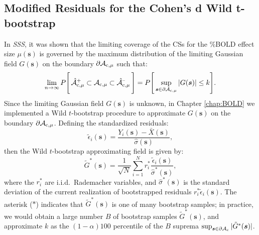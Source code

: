 \subsection{Modified Residuals for the Cohen's d Wild t-bootstrap}
\label{sec:Wild_t_bootstrap}
In \textit{SSS}, it was shown that the limiting coverage of the CSs for the \%BOLD effect size $\mu(\bm{s})$ is governed by the maximum distribution of the limiting Gaussian field $G(\bm{s})$ on the boundary $\operatorname{\partial\mathcal{A}_{c,\mu}}$ such that:
\begin{equation}
\label{Result_1}
\lim_{n\rightarrow\infty} P  \Bigg[\operatorname{\hat{\mathcal{A}}_{c,\mu}^+} \subset \operatorname{\mathcal{A}_{c,\mu}} \subset \operatorname{\hat{\mathcal{A}}_{c,\mu}^{\textrm{--}}} \Bigg] = P \Bigg[\sup_{\bm{s}\in\operatorname{\partial\mathcal{A}_{c,\mu}}}|G(\bm{s})|\leq k\Bigg].
\end{equation}
Since the limiting Gaussian field $G(\bm{s})$ is unknown, in Chapter \ref{chap:BOLD} we implemented a Wild $t$-bootstrap procedure to approximate $G(\bm{s})$ on the boundary $\operatorname{\partial\mathcal{A}_{c,\mu}}$. Defining the standardized residuals:
\begin{equation}
\label{eq:standardized_residuals}
\tilde{\epsilon}_{i}(\bm{s}) = \frac{ Y_{i}(\bm{s}) - \bar{X}(\bm{s})}{\hat{\sigma}(\bm{s})},
\end{equation}
then the Wild $t$-bootstrap approximating field is given by:
\begin{equation}
\label{eq:wild_bootstrap_approximating_field}
\tilde{G}^{*}(\bm{s}) = \frac{1}{\sqrt{N}}\sum_{i=1}^{N} r^*_i\frac{\tilde{\epsilon}_{i}(\bm{s})}{\hat{\sigma}^*(\bm{s})},
\end{equation}
where the $r^{*}_i$ are i.i.d.\ Rademacher variables, and $\hat{\sigma}^{*}(\bm{s})$ is the standard deviation of the current realization of bootstrapped residuals $r^{*}_i\tilde{\epsilon}_{i}(\bm{s})$. The asterisk ($*$) indicates that $\tilde{G}^{*}(\bm{s})$ is one of many bootstrap samples; in practice, we would obtain a large number $B$ of bootstrap samples $\tilde{G}^{*}(\bm{s})$, and approximate $k$ as the $(1 - \alpha)100$ percentile of the $B$ suprema $\sup_{\bm{s}\in\operatorname{\partial\mathcal{A}_{c}}}|\tilde{G}^*(\bm{s})|$.

